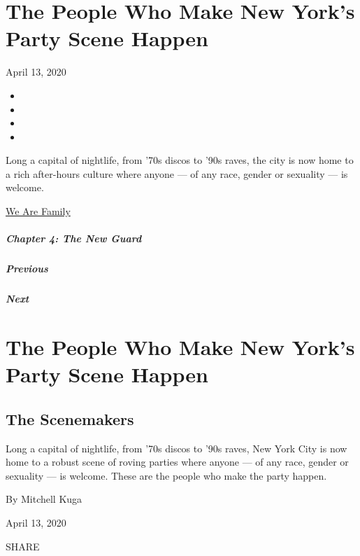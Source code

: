\hypertarget{the-people-who-make-new-yorks-party-scene-happen}{%
\section{The People Who Make New York's Party Scene
Happen}\label{the-people-who-make-new-yorks-party-scene-happen}}

April 13, 2020

\begin{itemize}
\item
\item
\item
\item
\end{itemize}

Long a capital of nightlife, from '70s discos to '90s raves, the city is
now home to a rich after-hours culture where anyone --- of any race,
gender or sexuality --- is welcome.

\href{https://www.nytimes.com/interactive/2020/04/13/t-magazine/culture-issue-2020.html}{We
Are Family}

\hypertarget{chapter-4-the-new-guard}{%
\subparagraph{Chapter 4: The New Guard}\label{chapter-4-the-new-guard}}

\hypertarget{previous}{%
\subparagraph{Previous}\label{previous}}

\hypertarget{next}{%
\subparagraph{Next}\label{next}}

\hypertarget{the-people-who-make-new-yorks-party-scene-happen-1}{%
\section{The People Who Make New York's Party Scene
Happen}\label{the-people-who-make-new-yorks-party-scene-happen-1}}

\hypertarget{the-scenemakers}{%
\subsection{The Scenemakers}\label{the-scenemakers}}

Long a capital of nightlife, from '70s discos to '90s raves, New York
City is now home to a robust scene of roving parties where anyone --- of
any race, gender or sexuality --- is welcome. These are the people who
make the party happen.

By Mitchell Kuga

April 13, 2020

SHARE

